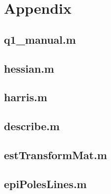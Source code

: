 \documentclass[a4paper, 10pt, conference]{ieeeconf}
\begin{document}
\onecolumn
\section*{Appendix}

\subsection*{q1\_manual.m}

\newpage

\subsection*{hessian.m}

\newpage

\subsection*{harris.m}

\newpage

\subsection*{describe.m}

\newpage

\subsection*{estTransformMat.m}

\newpage

\subsection*{epiPolesLines.m}

\newpage
\end{document}
